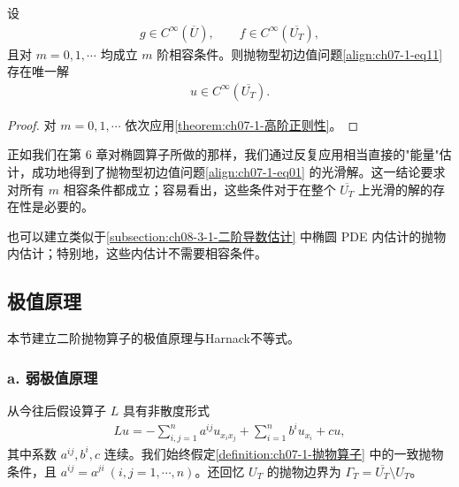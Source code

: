 \documentclass[../../main.tex]{subfiles}
\begin{document}
\begin{theorem}[无穷次可微性。]\label{theorem:ch07-1-无穷可微性}设
\begin{align*}
g\in C^\infty(\overline{U}),\qquad f\in C^\infty(\overline{U_T}),
\end{align*}
且对 $m=0,1,\cdots$ 均成立 $m$ 阶相容条件。则抛物型初边值问题\eqref{align:ch07-1-eq11} 存在唯一解
\begin{align*}
u\in C^\infty(\overline{U_T}).
\end{align*}
\end{theorem}

\begin{proof}
对 $m=0,1,\cdots$ 依次应用\cref{theorem:ch07-1-高阶正则性}。
\end{proof}

正如我们在第 6 章对椭圆算子所做的那样，我们通过反复应用相当直接的"能量"估计，成功地得到了抛物型初边值问题\eqref{align:ch07-1-eq01} 的光滑解。这一结论要求对所有 $m$ 相容条件都成立；容易看出，这些条件对于在整个 $\overline{U_T}$ 上光滑的解的存在性是必要的。

也可以建立类似于\cref{subsection:ch08-3-1-二阶导数估计} 中椭圆 PDE 内估计的抛物内估计；特别地，这些内估计不需要相容条件。

\subsection{极值原理}\label{subsection:ch07-1-4-极值原理}

本节建立二阶抛物算子的极值原理与Harnack不等式。

\subsubsection*{a. 弱极值原理}

从今往后假设算子 $L$ 具有非散度形式
\begin{align}
Lu = -\sum_{i,j=1}^n a^{ij}u_{x_ix_j} + \sum_{i=1}^n b^i u_{x_i} + cu,\label{align:ch07-1-eq61}
\end{align}
其中系数 $a^{ij},b^i,c$ 连续。我们始终假定\cref{definition:ch07-1-抛物算子} 中的一致抛物条件，且 $a^{ij}=a^{ji}\ (i,j=1,\cdots,n)$。还回忆 $U_T$ 的抛物边界为 $\Gamma_T=\overline{U_T}\setminus U_T$。
\end{document}
